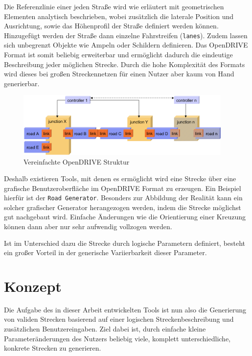 Die Referenzlinie einer jeden Straße wird wie erläutert mit geometrischen Elementen analytisch beschrieben, wobei zusätzlich die laterale Position und Ausrichtung, sowie das Höhenprofil der Straße definiert werden können. Hinzugefügt werden der Straße dann einzelne Fahrstreifen (\texttt{lanes}). Zudem lassen sich unbegrenzt Objekte wie Ampeln oder Schildern definieren. \cite{OpenDRIVEDoku.2019} Das OpenDRIVE Format ist somit beliebig erweiterbar und ermöglicht dadurch die eindeutige Beschreibung jeder möglichen Strecke. Durch die hohe Komplexität des Formats wird dieses bei großen Streckennetzen für einen Nutzer aber kaum von Hand generierbar.

\begin{figure}[H]
\flushleft
\includegraphics[width=0.95\textwidth]{fig/fig3.png}
\caption{Vereinfachte OpenDRIVE Struktur \cite{Dupuis.2006}}
\label{abb3}
\end{figure}

Deshalb existieren Tools, mit denen es ermöglicht wird eine Strecke über eine grafische Benutzeroberfläche im OpenDRIVE Format zu erzeugen. Ein Beispiel hierfür ist der \texttt{Road Generator}.\cite{RoadGenerator.2019} Besonders zur Abbildung der Realität kann ein solcher grafischer Generator herangezogen werden, indem die Strecke möglichst gut nachgebaut wird. Einfache Änderungen wie die Orientierung einer Kreuzung können dann aber nur sehr aufwendig vollzogen werden.

Ist im Unterschied dazu die Strecke durch logische Parametern definiert, besteht ein großer Vorteil in der generische Variierbarkeit dieser Parameter.

\chapter {Konzept}
Die Aufgabe des in dieser Arbeit entwickelten Tools ist nun also die Generierung von validen Strecken basierend auf einer logischen Streckenbeschreibung und zusätzlichen Benutzereingaben. Ziel dabei ist, durch einfache kleine Parameteränderungen des Nutzers beliebig viele, komplett unterschiedliche, konkrete Strecken zu generieren.

